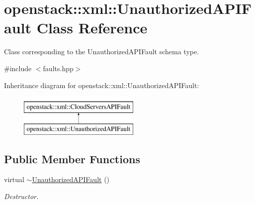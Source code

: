 \hypertarget{classopenstack_1_1xml_1_1UnauthorizedAPIFault}{
\section{openstack::xml::UnauthorizedAPIFault Class Reference}
\label{classopenstack_1_1xml_1_1UnauthorizedAPIFault}
}


Class corresponding to the UnauthorizedAPIFault schema type.  




{\ttfamily \#include $<$faults.hpp$>$}

Inheritance diagram for openstack::xml::UnauthorizedAPIFault:\begin{figure}[H]
\begin{center}
\leavevmode
\includegraphics[height=2.000000cm]{classopenstack_1_1xml_1_1UnauthorizedAPIFault}
\end{center}
\end{figure}
\subsection*{Public Member Functions}
\begin{DoxyCompactItemize}
\item 
\hypertarget{classopenstack_1_1xml_1_1UnauthorizedAPIFault_a1e1d060383efb3b70e00b1be9082cbf2}{
virtual \hyperlink{classopenstack_1_1xml_1_1UnauthorizedAPIFault_a1e1d060383efb3b70e00b1be9082cbf2}{$\sim$UnauthorizedAPIFault} ()}
\label{classopenstack_1_1xml_1_1UnauthorizedAPIFault_a1e1d060383efb3b70e00b1be9082cbf2}

\begin{DoxyCompactList}\small\item\em Destructor. \item\end{DoxyCompactList}\end{DoxyCompactItemize}
